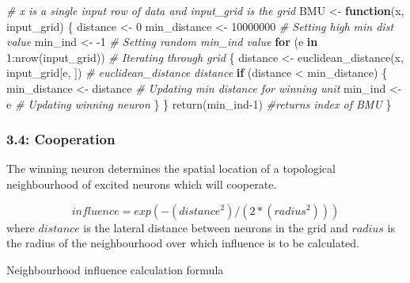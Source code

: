 \documentclass[
]{article}
\newenvironment{Shaded}{\begin{snugshade}}{\end{snugshade}}
\newcommand{\CommentTok}[1]{\textcolor[rgb]{0.56,0.35,0.01}{\textit{#1}}}
\newcommand{\ControlFlowTok}[1]{\textcolor[rgb]{0.13,0.29,0.53}{\textbf{#1}}}
\newcommand{\DecValTok}[1]{\textcolor[rgb]{0.00,0.00,0.81}{#1}}
\newcommand{\FunctionTok}[1]{\textcolor[rgb]{0.00,0.00,0.00}{#1}}
\newcommand{\NormalTok}[1]{#1}
\newcommand{\OtherTok}[1]{\textcolor[rgb]{0.56,0.35,0.01}{#1}}
\newcommand{\SpecialCharTok}[1]{\textcolor[rgb]{0.00,0.00,0.00}{#1}}
\begin{document}
\begin{Shaded}
\begin{Highlighting}[]
\CommentTok{\# x is a single input row of data and input\_grid is the grid}
\NormalTok{BMU }\OtherTok{\textless{}{-}} \ControlFlowTok{function}\NormalTok{(x, input\_grid) \{ }
\NormalTok{  distance }\OtherTok{\textless{}{-}} \DecValTok{0}
\NormalTok{  min\_distance }\OtherTok{\textless{}{-}} \DecValTok{10000000} \CommentTok{\# Setting high min dist value}
\NormalTok{  min\_ind }\OtherTok{\textless{}{-}} \SpecialCharTok{{-}}\DecValTok{1} \CommentTok{\# Setting random min\_ind value}
  \ControlFlowTok{for}\NormalTok{ (e }\ControlFlowTok{in} \DecValTok{1}\SpecialCharTok{:}\FunctionTok{nrow}\NormalTok{(input\_grid)) }\CommentTok{\# Iterating through grid}
\NormalTok{  \{}
\NormalTok{    distance }\OtherTok{\textless{}{-}} \FunctionTok{euclidean\_distance}\NormalTok{(x, input\_grid[e, ]) }\CommentTok{\# euclidean\_distance distance}
    \ControlFlowTok{if}\NormalTok{ (distance }\SpecialCharTok{\textless{}}\NormalTok{ min\_distance) \{}
\NormalTok{      min\_distance }\OtherTok{\textless{}{-}}\NormalTok{ distance }\CommentTok{\# Updating min distance for winning unit}
\NormalTok{      min\_ind }\OtherTok{\textless{}{-}}\NormalTok{ e }\CommentTok{\# Updating winning neuron}
\NormalTok{    \}}
\NormalTok{  \}}
  \FunctionTok{return}\NormalTok{(min\_ind}\DecValTok{{-}1}\NormalTok{) }\CommentTok{\#returns index of BMU}
\NormalTok{\}}
\end{Highlighting}
\end{Shaded}

\hypertarget{cooperation}{%
\subsubsection{3.4: Cooperation}\label{cooperation}}

The winning neuron determines the spatial location of a topological
neighbourhood of excited neurons which will cooperate.

\begin{equation}
 influence = exp(-(distance^{2}) / (2 * (radius^{2}))) 
 \end{equation} where \(distance\) is the lateral distance between
neurons in the grid and \(radius\) is the radius of the neighbourhood
over which influence is to be calculated.

Neighbourhood influence calculation formula
\end{document}
